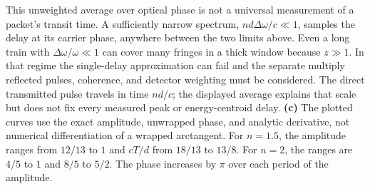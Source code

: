 This unweighted average over optical phase is not a universal
measurement of a packet's transit time. A sufficiently narrow
spectrum, $nd\Delta\omega/c\ll1$, samples the delay at its carrier
phase, anywhere between the two limits above. Even a long train
with $\Delta\omega/\omega\ll1$ can cover many fringes in a thick
window because $z\gg1$. In that regime the single-delay approximation
can fail and the separate multiply reflected pulses, coherence,
and detector weighting must be considered. The direct transmitted
pulse travels in time $nd/c$; the displayed average explains that
scale but does not fix every measured peak or energy-centroid delay.
\textbf{(c)} The plotted curves use the exact amplitude, unwrapped
phase, and analytic derivative, not numerical differentiation of a
wrapped arctangent. For $n=1.5$, the amplitude ranges from
$12/13$ to $1$ and $cT/d$ from $18/13$ to $13/8$.
For $n=2$, the ranges are $4/5$ to $1$ and $8/5$ to $5/2$.
The phase increases by $\pi$ over each period of the amplitude.
\begin{center}

\end{center}

